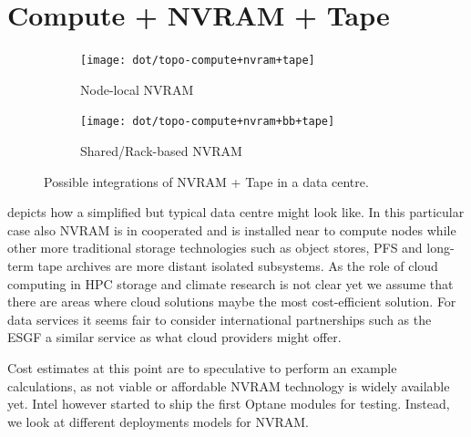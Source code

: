 \documentclass{../../template/esiwace-report}
\begin{document}

\section{Compute + NVRAM + Tape}
\label{sec:compute + nvram + tape}

\begin{figure}
	\centering
	\begin{subfigure}[t]{0.49\textwidth}
		\centering
		\texttt{[image: dot/topo-compute+nvram+tape]}

		\caption{Node-local NVRAM}
	\end{subfigure}
	\begin{subfigure}[t]{0.49\textwidth}
		\centering
		\texttt{[image: dot/topo-compute+nvram+bb+tape]}

		\caption{Shared/Rack-based NVRAM}
	\end{subfigure}


	\caption{Possible integrations of NVRAM + Tape in a data centre.}
	\label{fig:topology compute + nvram + tape}
\end{figure}

 depicts how a simplified but typical data centre might look like.
In this particular case also NVRAM is in cooperated and is installed near to compute nodes while other more traditional storage technologies such as object stores, PFS and long-term tape archives are more distant isolated subsystems.
As the role of cloud computing in HPC storage and climate research is not clear yet we assume that there are areas where cloud solutions maybe the most cost-efficient solution.
For data services it seems fair to consider international partnerships such as the ESGF a similar service as what cloud providers might offer.


Cost estimates at this point are to speculative to perform an example calculations, as not viable or affordable NVRAM technology is widely available yet.
Intel however started to ship the first Optane modules for testing\cite{agam_shah_intel_2017}.
Instead, we look at different deployments models for NVRAM.
\end{document}

